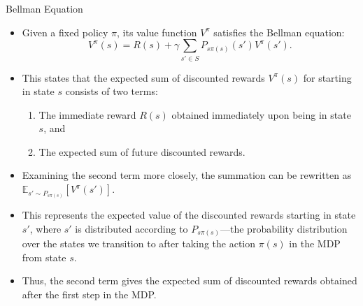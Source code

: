 \documentclass[handout]{beamer}
\begin{document}
\begin{frame}{Bellman Equation}
\scriptsize
\begin{itemize}
    \item Given a fixed policy \( \pi \), its value function \( V^{\pi} \) satisfies the Bellman equation:
    \[
    V^{\pi}(s) = R(s) + \gamma \sum_{s' \in S} P_{s\pi(s)}(s') V^{\pi}(s').
    \]
    \item This states that the expected sum of discounted rewards \( V^{\pi}(s) \) for starting in state \( s \) consists of two terms:
    \begin{enumerate}\scriptsize
        \item The immediate reward \( R(s) \) obtained immediately upon being in state \( s \), and
        \item The expected sum of future discounted rewards.
    \end{enumerate}
    \item Examining the second term more closely, the summation can be rewritten as \( \mathbb{E}_{s' \sim P_{s\pi(s)}}[V^{\pi}(s')] \).
    \item This represents the expected value of the discounted rewards starting in state \( s' \), where \( s' \) is distributed according to \( P_{s\pi(s)} \)—the probability distribution over the states we transition to after taking the action \( \pi(s) \) in the MDP from state \( s \).
    \item Thus, the second term gives the expected sum of discounted rewards obtained after the first step in the MDP.
\end{itemize}
\end{frame}
\end{document}
